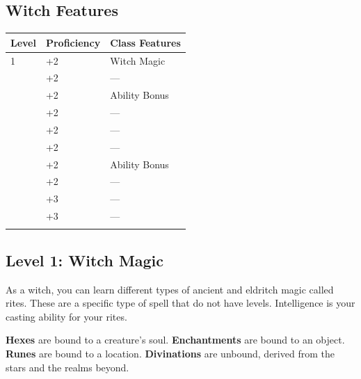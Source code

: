 \documentclass[12pt,letterpaper,twocolumn,openany,nodeprecatedcode,bg=none]{dndbook}
\let\oldsubsection\subsection
\renewcommand{\subsection}[1]{%
  \needspace{5\baselineskip}%
  \oldsubsection{#1}%
}
\begin{document}
\subsection{Witch Features}\label{witch-features}


{\def\LTcaptype{none} %
\begin{table}[!htbp]
\centering
\begin{tabular}{@{}
  >{\raggedright\arraybackslash}p{}
  >{\raggedright\arraybackslash}p{}
  >{\raggedright\arraybackslash}p{}@{}}
\toprule\noalign{}
\begin{minipage}[b]{\linewidth}\raggedright
Level
\end{minipage} & \begin{minipage}[b]{\linewidth}\raggedright
Proficiency
\end{minipage} & \begin{minipage}[b]{\linewidth}\raggedright
Class Features
\end{minipage} \\
\midrule\noalign{}
1 & +2 & Witch Magic \\
2 & +2 & --- \\
3 & +2 & Ability Bonus \\
4 & +2 & --- \\
5 & +2 & --- \\
6 & +2 & --- \\
7 & +2 & Ability Bonus \\
8 & +2 & --- \\
9 & +3 & --- \\
10 & +3 & --- \\
\bottomrule\noalign{}
\end{tabular}
\end{table}
}

\subsection{Level 1: Witch Magic}\label{level-1-witch-magic}

As a witch, you can learn different types of ancient and eldritch magic
called rites. These are a specific type of spell that do not have
levels. Intelligence is your casting ability for your rites.

\textbf{Hexes} are bound to a creature's soul. \textbf{Enchantments} are
bound to an object. \textbf{Runes} are bound to a location.
\textbf{Divinations} are unbound, derived from the stars and the realms
beyond.
\end{document}
